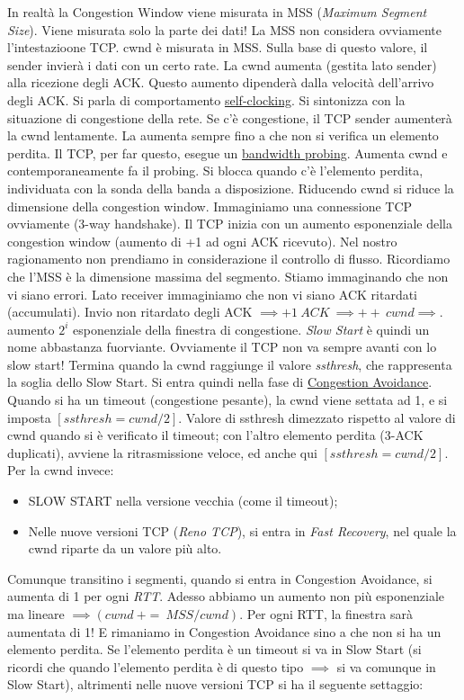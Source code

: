 In realtà la Congestion Window viene misurata in MSS (\textit{Maximum Segment Size}). Viene misurata solo la parte dei dati! La MSS non considera ovviamente l'intestazioone TCP. cwnd è misurata in MSS. Sulla base di questo valore, il sender invierà i dati con un certo rate. La cwnd aumenta (gestita lato sender) alla ricezione degli ACK. Questo aumento dipenderà dalla velocità dell'arrivo degli ACK. Si parla di comportamento \underline{self-clocking}. Si sintonizza con la situazione di congestione della rete. Se c'è congestione, il TCP sender aumenterà la cwnd lentamente. La aumenta sempre fino a che non si verifica un elemento perdita. Il TCP, per far questo, esegue un \underline{bandwidth probing}. Aumenta cwnd e contemporaneamente fa il probing. Si blocca quando c'è l'elemento perdita, individuata con la sonda della banda a disposizione. Riducendo cwnd si riduce la dimensione della congestion window. Immaginiamo una connessione TCP ovviamente (3-way handshake). Il TCP inizia con un aumento esponenziale della congestion window (aumento di +1 ad ogni ACK ricevuto). Nel nostro ragionamento non prendiamo in considerazione il controllo di flusso. Ricordiamo che l'MSS è la dimensione massima del segmento. Stiamo immaginando che non vi siano errori. Lato receiver immaginiamo che non vi siano ACK ritardati (accumulati). Invio non ritardato degli ACK $\implies +1\ ACK\ \implies ++\ cwnd \implies$. aumento $2^i$ esponenziale della finestra di congestione. \textit{Slow Start} è quindi un nome abbastanza fuorviante. Ovviamente il TCP non va sempre avanti con lo slow start! Termina quando la cwnd raggiunge il valore \textit{ssthresh}, che rappresenta la soglia dello Slow Start. Si entra quindi nella fase di \underline{Congestion Avoidance}. Quando si ha un timeout (congestione pesante), la cwnd viene settata ad 1, e si imposta $[ssthresh = cwnd/2]$. Valore di ssthresh dimezzato rispetto al valore di cwnd quando si è verificato il timeout; con l'altro elemento perdita (3-ACK duplicati), avviene la ritrasmissione veloce, ed anche qui $[ssthresh = cwnd/2]$. Per la cwnd invece:

\begin{itemize}
\item SLOW START nella versione vecchia (come il timeout);
\item Nelle nuove versioni TCP (\textit{Reno TCP}), si entra in \textit{Fast Recovery}, nel quale la cwnd riparte da un valore più alto.
\end{itemize}

Comunque transitino i segmenti, quando si entra in Congestion Avoidance, si aumenta di 1 per ogni \textit{RTT}. Adesso abbiamo un aumento non più esponenziale ma lineare $\implies (cwnd\ +=\ MSS/cwnd)$. 
Per ogni RTT, la finestra sarà aumentata di 1! E rimaniamo in Congestion Avoidance sino a che non si ha un elemento perdita. Se l'elemento perdita è un timeout si va in Slow Start (si ricordi che quando l'elemento perdita è di questo tipo $\implies$ si va comunque in Slow Start), altrimenti nelle nuove versioni TCP si ha il seguente settaggio:

